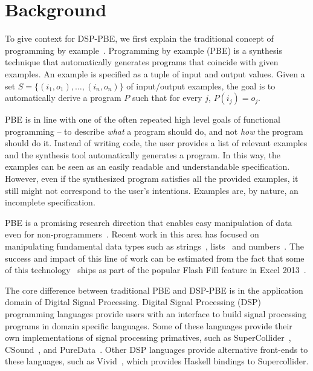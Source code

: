 \section{Background}
\label{sec:background}

To give context for DSP-PBE, we first explain the traditional concept of programming by example~\cite{cypher93,lieberman01,synasc12}.
Programming by example (PBE) is a synthesis technique that automatically generates programs that coincide with given examples.
An example is specified as a tuple of input and output values.
Given a set $S= \{(i_1, o_1),\ldots, (i_n, o_n)\}$ of input/output examples, the goal is to automatically derive a program $P$ such that for every $j$, $P(i_j) = o_j$.

PBE is in line with one of the often repeated high level goals of functional programming -- to describe \textit{what} a program should do, and not \textit{how} the program should do it.
Instead of writing code, the user provides a list of relevant examples and the synthesis tool automatically generates a program.
In this way, the examples can be seen as an easily readable and understandable specification.
However, even if the synthesized program satisfies all the provided examples, it still might not correspond to the user's intentions.
Examples are, by nature, an incomplete specification.

PBE is a promising research direction that enables easy manipulation of data even for non-programmers~\cite{GulwaniHS12}.
Recent work in this area has focused on manipulating fundamental data types such as strings~\cite{vldb12,icml13}, lists~\cite{FeserCD15,poseraZ15} and numbers~\cite{cav12}.
The success and impact of this line of work can be estimated from the fact that some of this technology~\cite{flashFillPOPL} ships as part of the popular Flash Fill feature in Excel 2013~\cite{flashfill}.


The core difference between traditional PBE and DSP-PBE is in the application domain of Digital Signal Processing.
Digital Signal Processing (DSP) programming languages provide users with an interface to build signal processing programs in domain specific languages.
Some of these languages provide their own implementations of signal processing primatives, such as SuperCollider~\cite{supercollider}, CSound~\cite{csound}, and PureData~\cite{puredata}.
Other DSP languages provide alternative front-ends to these languages, such as Vivid~\cite{vivid}, which provides Haskell bindings to Supercollider.

